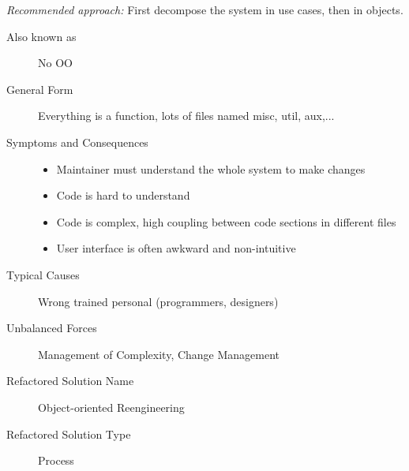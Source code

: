 \textit{Recommended approach:} First decompose the system in use cases, then in objects.

\begin{description}
  \item [Also known as] No OO
  \item[General Form] Everything is a function, lots of files named misc, util, aux,...
  \item[Symptoms and Consequences] \hfill
  \begin{itemize}
    \item Maintainer must understand the whole system to make changes
     \item Code is hard to understand
     \item Code is complex, high coupling between code sections in different files
     \item User interface is often awkward and non-intuitive
  \end{itemize}
  \item[Typical Causes] Wrong trained personal (programmers, designers)
  \item[Unbalanced Forces] Management of Complexity, Change Management
  \item[Refactored Solution Name] Object-oriented Reengineering
  \item[Refactored Solution Type] Process
\end{description}
\newpage

